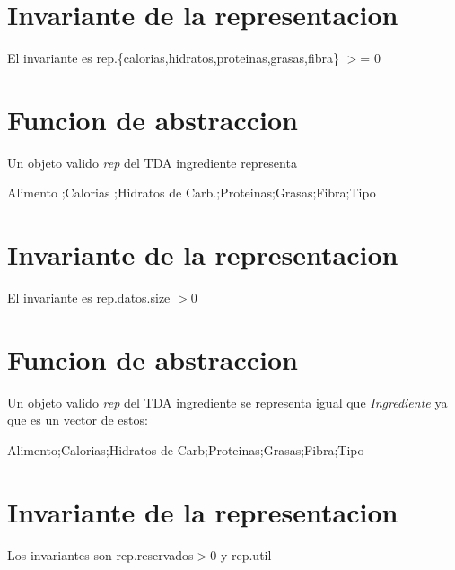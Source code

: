 \hypertarget{repConjunto_invConjunto}{}\section{Invariante de la representacion}\label{repConjunto_invConjunto}
El invariante es rep.\{calorias,hidratos,proteinas,grasas,fibra\} $>$= 0\hypertarget{repConjunto_faConjunto}{}\section{Funcion de abstraccion}\label{repConjunto_faConjunto}
Un objeto valido {\itshape rep} del T\+DA ingrediente representa

Alimento ;Calorias ;Hidratos de Carb.;Proteinas;Grasas;Fibra;Tipo\hypertarget{repConjunto_invConjunto}{}\section{Invariante de la representacion}\label{repConjunto_invConjunto}
El invariante es rep.\+datos.\+size $>$0\hypertarget{repConjunto_faConjunto}{}\section{Funcion de abstraccion}\label{repConjunto_faConjunto}
Un objeto valido {\itshape rep} del T\+DA ingrediente se representa igual que {\itshape Ingrediente} ya que es un vector de estos\+:

Alimento;Calorias;Hidratos de Carb;Proteinas;Grasas;Fibra;Tipo\hypertarget{repConjunto_invConjunto}{}\section{Invariante de la representacion}\label{repConjunto_invConjunto}
Los invariantes son rep.\+reservados$>$0 y rep.\+util 
